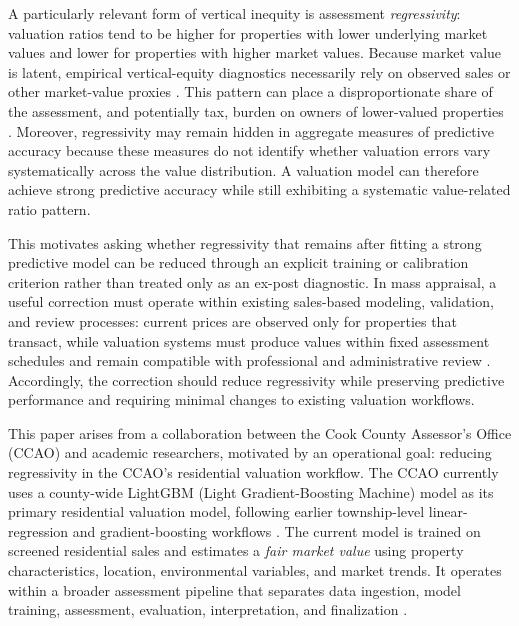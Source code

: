 \documentclass[10pt]{article}
\theoremstyle{definition}
\newcommand{\1}{\mathbf{1}}
\begin{document}
{A particularly relevant form of vertical inequity is assessment \emph{regressivity}: valuation ratios tend to be higher for properties with lower underlying market values and lower for properties with higher market values. Because market value is latent, empirical vertical-equity diagnostics necessarily rely on observed sales or other market-value proxies \cite{IAAO2026ExposureRatio}. This pattern can place a disproportionate share of the assessment, and potentially tax, burden on owners of lower-valued properties \cite{McMillen2020,Berry2021,AvenancioLeonHoward2022}. Moreover, regressivity may remain hidden in aggregate measures of predictive accuracy because these measures do not identify whether valuation errors vary systematically across the value distribution. A valuation model can therefore achieve strong predictive accuracy while still exhibiting a systematic value-related ratio pattern.}


{This motivates asking whether regressivity that remains after fitting a strong predictive model can be reduced through an explicit training or calibration criterion rather than treated only as an ex-post diagnostic. In mass appraisal, a useful correction must operate within existing sales-based modeling, validation, and review processes: current prices are observed only for properties that transact, while valuation systems must produce values within fixed assessment schedules and remain compatible with professional and administrative review \cite{IAAO2020SalesVerification,IAAO2018AVM,IAAO2025Mass}. Accordingly, the correction should reduce regressivity while preserving predictive performance and requiring minimal changes to existing valuation workflows.}

This paper arises from a collaboration between the Cook County Assessor's Office (CCAO) and academic researchers, motivated by an operational goal: reducing regressivity in the CCAO's residential valuation workflow. The CCAO currently uses a county-wide LightGBM (Light Gradient-Boosting Machine) model \cite{lightgbm} as its primary residential valuation model, {following earlier township-level linear-regression and gradient-boosting workflows} \cite{CCAOModelResAVM2026}. The current model is trained on screened residential sales and estimates a \emph{fair market value} using property characteristics, location, environmental variables, and market trends. It operates within a broader assessment pipeline that separates data ingestion, model training, assessment, evaluation, interpretation, and finalization \cite{CCAOModelResAVM2026}.
\end{document}
